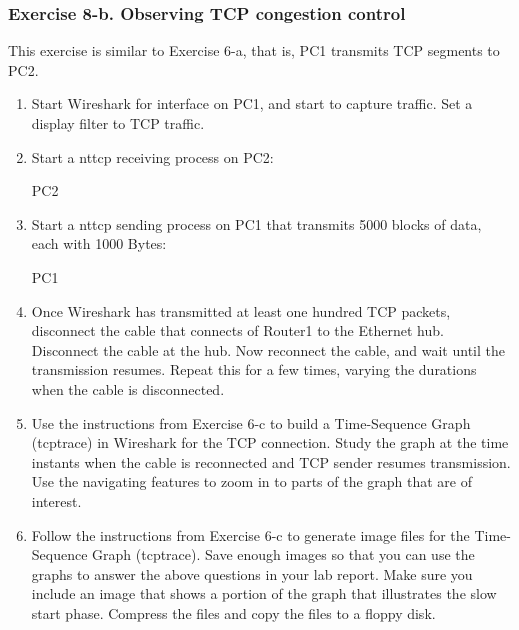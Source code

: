 \subsubsection{Exercise 8-b. Observing TCP congestion control}

This exercise is similar to Exercise 6-a, that is, PC1 transmits TCP segments to PC2.
\begin{enumerate}
	\item Start Wireshark for interface  on PC1, and start to capture traffic. Set a display filter to TCP traffic.
	\item Start a nttcp receiving process on PC2:
		\begin{cmdblock}
	PC2%
		\end{cmdblock}
	\item Start a nttcp sending process on PC1 that transmits 5000 blocks of data, each with 1000 Bytes:
		\begin{cmdblock}
	PC1%
		\end{cmdblock}
	\item Once Wireshark has transmitted at least one hundred TCP packets, disconnect the cable that connects  of Router1 to the Ethernet hub. Disconnect the cable at the hub. Now reconnect the cable, and wait until the transmission resumes. Repeat this for a few times, varying the durations when the cable is disconnected.
	\item Use the instructions from Exercise 6-c to build a Time-Sequence Graph (tcptrace) in Wireshark for the TCP connection. Study the graph at the time instants when the cable is reconnected and TCP sender resumes transmission. Use the navigating features to zoom in to parts of the graph that are of interest.
	\item Follow the instructions from Exercise 6-c to generate image files for the Time- Sequence Graph (tcptrace). Save enough images so that you can use the graphs to answer the above questions in your lab report. Make sure you include an image that shows a portion of the graph that illustrates the slow start phase. Compress the files and copy the files to a floppy disk.
\end{enumerate}

